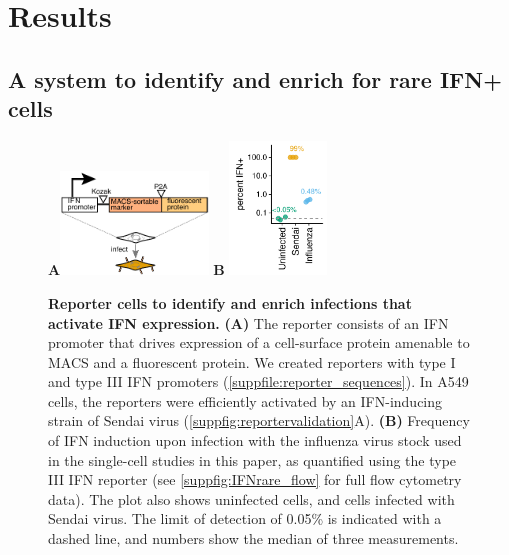 \documentclass[10pt,letterpaper]{article}
\newcommand{\SUPPFILE}[1]{\autoref{suppfile:#1}}
\newcommand{\SUPPFIG}[1]{\autoref{suppfig:#1}}
\begin{document}
\section*{Results}

\subsection*{A system to identify and enrich for rare IFN+ cells}

\begin{figure}[b!]
\centerline{
{\bf \Large A}\includegraphics[width=0.35\textwidth,valign=t]{figures/IFN_stochastic/IFN_reporter/IFN_reporter.pdf}
\hspace{0.02\textwidth}
{\bf \Large B} \includegraphics[width=0.23\textwidth,valign=t]{figures/IFN_stochastic/Flow/ifn_percent.pdf}
}
\caption{
{\bf Reporter cells to identify and enrich infections that activate IFN expression.}
{\bf (A)} The reporter consists of an IFN promoter that drives expression of a cell-surface protein amenable to MACS and a fluorescent protein.
We created reporters with type I and type III IFN promoters (\SUPPFILE{reporter_sequences}).
In A549 cells, the reporters were efficiently activated by an IFN-inducing strain of Sendai virus (\SUPPFIG{reportervalidation}A).
{\bf (B)}
Frequency of IFN induction upon infection with the influenza virus stock used in the single-cell studies in this paper, as quantified using the type III IFN reporter (see \SUPPFIG{IFNrare_flow} for full flow cytometry data).
The plot also shows uninfected cells, and cells infected with Sendai virus.
The limit of detection of 0.05\% is indicated with a dashed line, and numbers show the median of three measurements.
}
\label{fig:IFNrare}
\end{figure}
\end{document}
